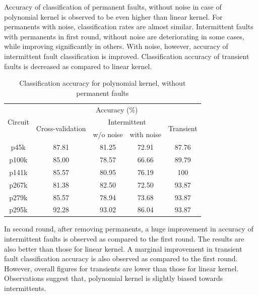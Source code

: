 Accuracy of classification of permanent faults, without noise in case of polynomial kernel is observed to be even higher than linear kernel. For permanents with noise, classification rates are almost similar. Intermittent faults with permanents in first round, without noise are deteriorating in some cases, while improving significantly in others. With noise, however, accuracy of intermittent fault classification is improved. Classification accuracy of transient faults is decreased as compared to linear kernel.

\begin{table}[h]
\captionsetup{justification=centering}
\begin{tabular}{ccccc}
\hline
\multirow{3}{*}{Circuit} & \multicolumn{4}{c}{Accuracy (\%)}\\ \cline{2-5} 
                         & \multirow{2}{*}{Cross-validation} & \multicolumn{2}{c}{Intermittent} & \multirow{2}{*}{Transient} \\ \cline{3-4}
                         &                                   & w/o noise      & with noise      &                            \\ \hline
p45k                     & 87.81                             & 81.25          & 72.91           & 87.76                      \\
p100k                    & 85.00                             & 78.57          & 66.66           & 89.79                      \\
p141k                    & 85.57                             & 80.95          & 76.19           & 100                        \\
p267k                    & 81.38                             & 82.50          & 72.50           & 93.87                      \\
p279k                    & 85.57                             & 78.94          & 73.68           & 93.87                      \\
p295k                    & 92.28                             & 93.02          & 86.04           & 93.87                      \\
\hline
\end{tabular}
\caption {Classification accuracy for polynomial kernel, without permanent faults}
\label{tab:polywop}
\end{table}

In second round, after removing permanents, a huge improvement in accuracy of intermittent faults is observed as compared to the first round. The results are also better than those for linear kernel.  A marginal improvement in transient fault classification accuracy is also observed as compared to the first round. However, overall figures for transients are lower than those for linear kernel. Observations suggest that, polynomial kernel is slightly biased towards intermittents.


